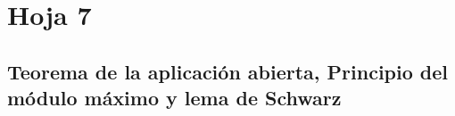 \newpage
\section{Hoja 7}
\subsection{Teorema de la aplicación abierta, Principio del módulo máximo y lema de Schwarz}

